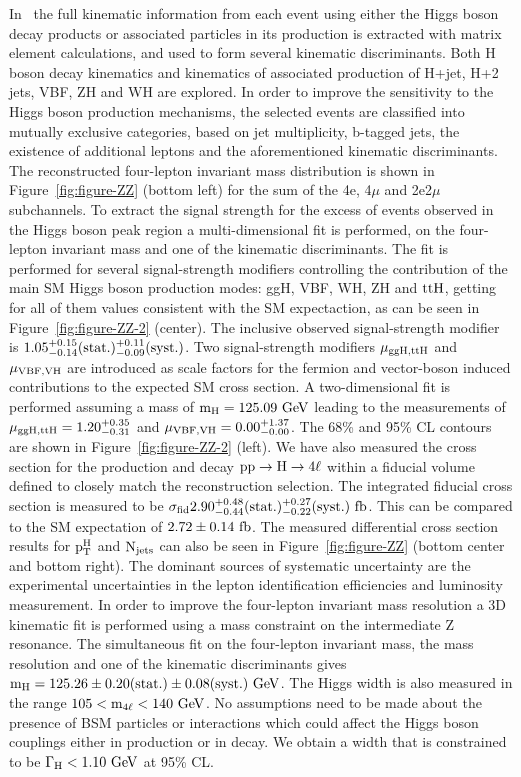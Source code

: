 \documentclass[10pt]{article}
\begin{document}
In~\cite{CMS:2017jkd} the full kinematic information from each event using either
the Higgs boson decay products or associated particles in its production is
extracted with matrix element calculations, and used to form several kinematic
discriminants. Both H boson decay kinematics and kinematics of associated
production of H+jet, H+2 jets, VBF, ZH and WH are explored. In order to improve
the sensitivity to the Higgs boson production mechanisms, the selected events
are classified into mutually exclusive categories, based on jet multiplicity,
b-tagged jets, the existence of additional leptons and the aforementioned
kinematic discriminants. The reconstructed four-lepton invariant mass distribution
is shown in Figure~\ref{fig:figure-ZZ} (bottom left) for the sum of the 4e,
4$\mu$ and 2e2$\mu$ subchannels. To extract the signal strength for the excess
of events observed in the Higgs boson peak region a multi-dimensional fit
is performed, on the four-lepton invariant mass and one of the kinematic
discriminants. The fit is performed for several signal-strength modifiers
controlling the contribution of the main SM Higgs boson production modes: ggH,
VBF, WH, ZH and ${\rm ttH}$, getting for all of them values consistent
with the SM expectaction, as can be seen in Figure~\ref{fig:figure-ZZ-2} (center).
The inclusive observed signal-strength
modifier is ${\rm 1.05_{-0.14}^{+0.15}(stat.)_{-0.09}^{+0.11}(syst.)}$.
Two signal-strength modifiers ${\rm \mu_{ggH,ttH}}$ and ${\rm \mu_{VBF,VH}}$ are
introduced as scale factors for the fermion and vector-boson induced contributions
to the expected SM cross section. A two-dimensional fit is performed assuming a
mass of ${\rm m_H = 125.09~GeV}$ leading to the measurements of
${\rm \mu_{ggH,ttH} = 1.20_{-0.31}^{+0.35}}$ and
${\rm \mu_{VBF,VH} = 0.00_{-0.00}^{+1.37}}$. The 68\% and 95\% CL contours are
shown in Figure~\ref{fig:figure-ZZ-2} (left). We have also
measured the cross section for the production and decay ${\rm pp \to H \to 4\ell}$
within a fiducial volume defined to closely match the reconstruction selection.
The integrated fiducial cross section is measured to be
${\rm \sigma_{fid} 2.90_{-0.44}^{+0.48}(stat.)_{-0.22}^{+0.27}(syst.)~fb}$.
This can be compared to the SM expectation of
${\rm 2.72 \pm 0.14~fb}$. The measured differential cross section results for
${\rm p_{T}^{H}}$ and ${\rm N_{jets}}$ can also be seen in Figure~\ref{fig:figure-ZZ}
(bottom center and bottom right). The dominant sources of systematic uncertainty are
the experimental uncertainties in the lepton identification efficiencies and
luminosity measurement. In order to improve the four-lepton invariant mass
resolution a 3D kinematic fit is performed using a mass constraint on the
intermediate Z resonance. The simultaneous fit on the four-lepton
invariant mass, the mass resolution and one of the kinematic discriminants
gives ${\rm m_{H} = 125.26 \pm 0.20(stat.) \pm 0.08(syst.)~GeV}$. The Higgs
width is also measured in the range ${\rm 105 < m_{4\ell} < 140~GeV}$. No
assumptions need to be made about the presence of BSM particles or interactions
which could affect the Higgs boson couplings either in production or in decay.
We obtain a width that is constrained to be ${\rm \Gamma_{H} < 1.10~GeV}$ at
95\% CL.
\end{document}
